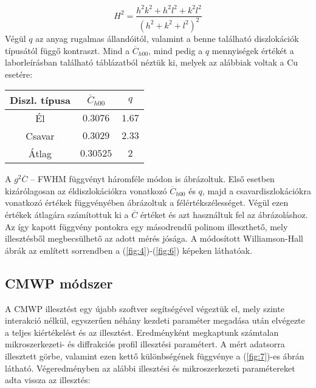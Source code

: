 \begin{multicols}{2}
\begin{equation}
H^{2}
=
\frac{h^{2} k^{2} + h^{2} l^{2} + k^{2} l^{2}}{\left( h^{2} + k^{2} + l^{2} \right)^{2}}
\end{equation}
Végül $q$ az anyag rugalmas állandóitól, valamint a benne található diszlokációk típusától függő kontraszt. Mind a $\overline{C}_{h00}$, mind pedig a $q$ mennyiségek értékét a laborleírásban található táblázatból néztük ki, melyek az alábbiak voltak a Cu esetére:
\begin{center}
\begin{tabular}{|c|c|c|}
\hline
Diszl. típusa & $\overline{C}_{h00}$ & $q$    \\ \hline\hline
Él            & $0.3076$             & $1.67$ \\
Csavar        & $0.3029$             & $2.33$ \\ \hline
Átlag         & $0.30525$            & $2$    \\ \hline
\end{tabular}
\end{center}
A $g^{2} \overline{C}$ -- FWHM függvényt háromféle módon is ábrázoltuk. Első esetben kizárólagosan az éldiszlokációkra vonatkozó $\overline{C}_{h00}$ és $q$, majd a csavardiszlokációkra vonatkozó értékek függvényében ábrázoltuk a félértékszélességet. Végül ezen értékek átlagára számítottuk ki a $\overline{C}$ értéket és azt használtuk fel az ábrázoláshoz. Az így kapott függvény pontokra egy másodrendű polinom illeszthető, mely illesztésből megbecsülhető az adott mérés jósága. A módosított Williamson-Hall ábrák az említett sorrendben a (\ref{fig:4})-(\ref{fig:6}) képeken láthatóak.

\subsection{CMWP módszer}
A CMWP illesztést egy újabb szoftver segítségével végeztük el, mely szinte interakció nélkül, egyszerűen néhány kezdeti paraméter megadása után elvégezte a teljes kiértékelést és az illesztést. Eredményként megkaptunk számtalan mikroszerkezeti- és diffrakciós profil illesztési paramétert. A mért adatsorra illesztett görbe, valamint ezen kettő különbségének függvénye a (\ref{fig:7})-es ábrán látható. Végeredményben az alábbi illesztési és mikroszerkezeti paramétereket adta vissza az illesztés:


\end{multicols}
